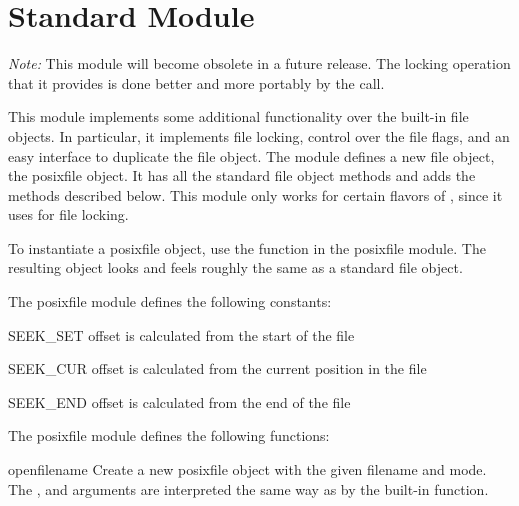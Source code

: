 \section{Standard Module }

\emph{Note:} This module will become obsolete in a future release.
The locking operation that it provides is done better and more
portably by the  call.

This module implements some additional functionality over the built-in
file objects.  In particular, it implements file locking, control over
the file flags, and an easy interface to duplicate the file object.
The module defines a new file object, the posixfile object.  It
has all the standard file object methods and adds the methods
described below.  This module only works for certain flavors of
\UNIX{}, since it uses  for file locking.

To instantiate a posixfile object, use the  function in
the posixfile module.  The resulting object looks and feels roughly
the same as a standard file object.

The posixfile module defines the following constants:

\renewcommand{\indexsubitem}{(in module posixfile)}
\begin{datadesc}{SEEK_SET}
offset is calculated from the start of the file
\end{datadesc}

\begin{datadesc}{SEEK_CUR}
offset is calculated from the current position in the file
\end{datadesc}

\begin{datadesc}{SEEK_END}
offset is calculated from the end of the file
\end{datadesc}

The posixfile module defines the following functions:

\renewcommand{\indexsubitem}{(in module posixfile)}

\begin{funcdesc}{open}{filename}
 Create a new posixfile object with the given filename and mode.  The
 ,  and  arguments are
 interpreted the same way as by the built-in  function.
\end{funcdesc}

